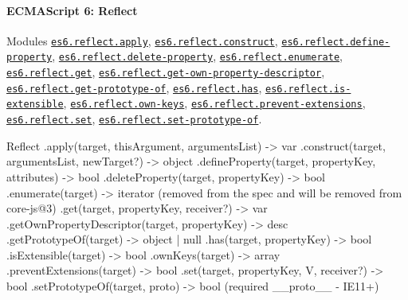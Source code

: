 \paragraph*{E\+C\+M\+A\+Script 6\+: Reflect}

Modules \href{https://github.com/zloirock/core-js/blob/v2.6.0/modules/es6.reflect.apply.js}{\tt {\ttfamily es6.\+reflect.\+apply}}, \href{https://github.com/zloirock/core-js/blob/v2.6.0/modules/es6.reflect.construct.js}{\tt {\ttfamily es6.\+reflect.\+construct}}, \href{https://github.com/zloirock/core-js/blob/v2.6.0/modules/es6.reflect.define-property.js}{\tt {\ttfamily es6.\+reflect.\+define-\/property}}, \href{https://github.com/zloirock/core-js/blob/v2.6.0/modules/es6.reflect.delete-property.js}{\tt {\ttfamily es6.\+reflect.\+delete-\/property}}, \href{https://github.com/zloirock/core-js/blob/v2.6.0/modules/es6.reflect.enumerate.js}{\tt {\ttfamily es6.\+reflect.\+enumerate}}, \href{https://github.com/zloirock/core-js/blob/v2.6.0/modules/es6.reflect.get.js}{\tt {\ttfamily es6.\+reflect.\+get}}, \href{https://github.com/zloirock/core-js/blob/v2.6.0/modules/es6.reflect.get-own-property-descriptor.js}{\tt {\ttfamily es6.\+reflect.\+get-\/own-\/property-\/descriptor}}, \href{https://github.com/zloirock/core-js/blob/v2.6.0/modules/es6.reflect.get-prototype-of.js}{\tt {\ttfamily es6.\+reflect.\+get-\/prototype-\/of}}, \href{https://github.com/zloirock/core-js/blob/v2.6.0/modules/es6.reflect.has.js}{\tt {\ttfamily es6.\+reflect.\+has}}, \href{https://github.com/zloirock/core-js/blob/v2.6.0/modules/es6.reflect.is-extensible.js}{\tt {\ttfamily es6.\+reflect.\+is-\/extensible}}, \href{https://github.com/zloirock/core-js/blob/v2.6.0/modules/es6.reflect.own-keys.js}{\tt {\ttfamily es6.\+reflect.\+own-\/keys}}, \href{https://github.com/zloirock/core-js/blob/v2.6.0/modules/es6.reflect.prevent-extensions.js}{\tt {\ttfamily es6.\+reflect.\+prevent-\/extensions}}, \href{https://github.com/zloirock/core-js/blob/v2.6.0/modules/es6.reflect.set.js}{\tt {\ttfamily es6.\+reflect.\+set}}, \href{https://github.com/zloirock/core-js/blob/v2.6.0/modules/es6.reflect.set-prototype-of.js}{\tt {\ttfamily es6.\+reflect.\+set-\/prototype-\/of}}. 
\begin{DoxyCode}
Reflect
  .apply(target, thisArgument, argumentsList) -> var
  .construct(target, argumentsList, newTarget?) -> object
  .defineProperty(target, propertyKey, attributes) -> bool
  .deleteProperty(target, propertyKey) -> bool
  .enumerate(target) -> iterator (removed from the spec and will be removed from core-js@3)
  .get(target, propertyKey, receiver?) -> var
  .getOwnPropertyDescriptor(target, propertyKey) -> desc
  .getPrototypeOf(target) -> object | null
  .has(target, propertyKey) -> bool
  .isExtensible(target) -> bool
  .ownKeys(target) -> array
  .preventExtensions(target) -> bool
  .set(target, propertyKey, V, receiver?) -> bool
  .setPrototypeOf(target, proto) -> bool (required \_\_proto\_\_ - IE11+)
\end{DoxyCode}
